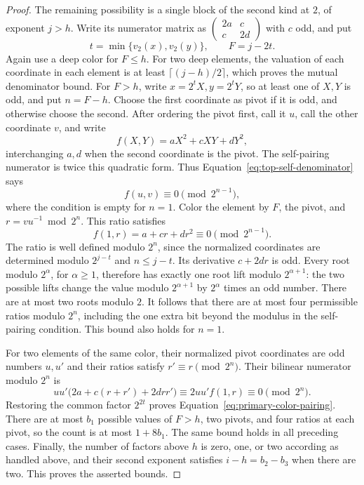 \begin{proof}
The remaining possibility is a single block of the second kind at
\(2\), of exponent \(j>h\). Write its numerator matrix as
\(\left(\begin{smallmatrix}2a&c\\c&2d\end{smallmatrix}\right)\)
with \(c\) odd, and put
\[
 t=\min\{v_2(x),v_2(y)\},\qquad F=j-2t.
\]
Again use a deep color for \(F\le h\). For two deep elements, the
valuation of each coordinate in each element is at least
\(\lceil(j-h)/2\rceil\), which proves the mutual denominator bound.
For \(F>h\), write \(x=2^tX,y=2^tY\), so at least one of \(X,Y\)
is odd, and put \(n=F-h\). Choose the first coordinate as pivot if
it is odd, and otherwise choose the second. After ordering the
pivot first, call it \(u\), call the other coordinate \(v\), and
write
\[
 f(X,Y)=aX^2+cXY+dY^2,
\]
interchanging \(a,d\) when the second coordinate is the pivot.
The self-pairing numerator is twice this quadratic form. Thus
Equation~\eqref{eq:top-self-denominator} says
\[
 f(u,v)\equiv0\pmod{2^{n-1}},
\]
where the condition is empty for \(n=1\). Color the element by
\(F\), the pivot, and \(r=vu^{-1}\bmod 2^n\). This ratio satisfies
\[
 f(1,r)=a+cr+dr^2\equiv0\pmod{2^{n-1}}.
\]
The ratio is well defined modulo \(2^n\), since the normalized
coordinates are determined modulo \(2^{j-t}\) and \(n\le j-t\).
Its derivative \(c+2dr\) is odd. Every root modulo \(2^\alpha\), for
\(\alpha\ge1\), therefore has exactly one root lift modulo
\(2^{\alpha+1}\): the two possible lifts change the value modulo
\(2^{\alpha+1}\) by \(2^\alpha\) times an odd number. There are at most two roots modulo
\(2\). It follows that there are at most four permissible ratios
modulo \(2^n\), including the one extra bit beyond the modulus in
the self-pairing condition. This bound also holds for \(n=1\).

For two elements of the same color, their normalized pivot
coordinates are odd numbers \(u,u'\) and their ratios satisfy
\(r'\equiv r\pmod{2^n}\). Their bilinear numerator modulo \(2^n\)
is
\[
 uu'\bigl(2a+c(r+r')+2drr'\bigr)
 \equiv 2uu'f(1,r)\equiv0\pmod{2^n}.
\]
Restoring the common factor \(2^{2t}\) proves
Equation~\eqref{eq:primary-color-pairing}. There are at most \(b_1\)
possible values of \(F>h\), two pivots, and four ratios at each
pivot, so the count is at most \(1+8b_1\). The same bound holds
in all preceding cases. Finally, the number of factors above \(h\)
is zero, one, or two according as handled above, and their second
exponent satisfies \(i-h=b_2-b_3\) when there are two. This proves
the asserted bounds.
\end{proof}


